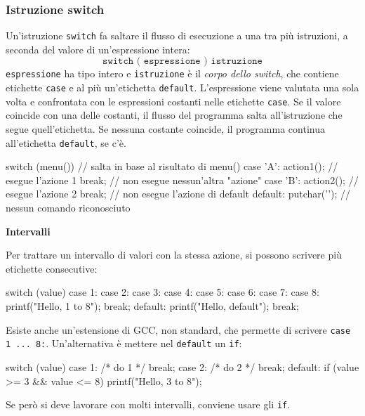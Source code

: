 \documentclass[11pt,a4paper]{article}
\begin{document}
\subsubsection{Istruzione switch}

Un'istruzione \lstinline|switch| fa saltare il flusso di esecuzione a una tra più istruzioni, a seconda del valore di un'espressione intera:
\[
\texttt{switch ( espressione ) istruzione}
\]
\texttt{espressione} ha tipo intero e \texttt{istruzione} è il \emph{corpo dello switch}, che contiene etichette \lstinline|case| e al più un'etichetta \lstinline|default|. L'espressione viene valutata una sola volta e confrontata con le espressioni costanti nelle etichette \lstinline|case|. Se il valore coincide con una delle costanti, il flusso del programma salta all'istruzione che segue quell'etichetta. Se nessuna costante coincide, il programma continua all'etichetta \lstinline|default|, se c'è.

\begin{codice}
switch (menu())   // salta in base al risultato di menu()
{
    case 'A': action1();     // esegue l'azione 1
              break;         // non esegue nessun'altra "azione"
    case 'B': action2();     // esegue l'azione 2
              break;         // non esegue l'azione di default
    default:  putchar('\a'); // nessun comando riconosciuto
}
\end{codice}

\medskip\noindent\textbf{Intervalli}\par\nopagebreak

Per trattare un intervallo di valori con la stessa azione, si possono scrivere più etichette consecutive:
\begin{codice}
switch (value)
{
    case 1:
    case 2:
    case 3:
    case 4:
    case 5:
    case 6:
    case 7:
    case 8:
        printf("Hello, 1 to 8\n");
        break;
    default:
        printf("Hello, default\n");
        break;
}
\end{codice}
Esiste anche un'estensione di GCC, non standard, che permette di scrivere \lstinline|case 1 ... 8:|. Un'alternativa è mettere nel \lstinline|default| un \lstinline|if|:
\begin{codice}
switch (value) {
    case 1:
        /* do 1 */
        break;
    case 2:
        /* do 2 */
        break;
    default:
        if (value >= 3 && value <= 8)
            printf("Hello, 3 to 8\n");
}
\end{codice}
Se però si deve lavorare con molti intervalli, conviene usare gli \lstinline|if|.
\end{document}
